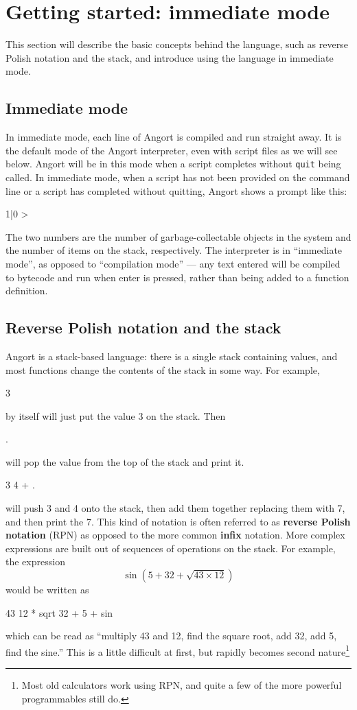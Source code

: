 \section{Getting started: immediate mode}
This section will describe the basic concepts behind the language,
such as reverse Polish notation and the stack, and introduce
using the language in immediate mode.   

\subsection{Immediate mode}
In immediate mode, each line of Angort is compiled and run straight
away. It is the default mode of the Angort interpreter, even with script
files as we will see below.
Angort will be in
this mode when a script completes without \texttt{quit} 
being called.
In immediate mode, when a script has not been provided on the command
line or a script has completed without quitting, Angort shows a prompt like this:
\begin{v}
1|0 >
\end{v}
The two numbers are the number of garbage-collectable objects in the
system and the number of items on the stack, respectively.
The interpreter is in ``immediate mode'', as opposed to ``compilation
mode'' --- any text entered will be compiled to bytecode and run when
enter is pressed,
rather than being added to a function definition.

\subsection{Reverse Polish notation and the stack}
Angort is a stack-based language:
there is a single stack containing
values, and most functions change the contents
of the stack in some way. For example,
\begin{v}
3
\end{v}
by itself will just put the value 3 on the stack. Then
\begin{v}
.
\end{v}
will pop the value from the top of the stack and print it.
\begin{v}
3 4 + .
\end{v}
will push 3 and 4 onto the stack, then add them together replacing them
with 7, and then print the 7. This kind of notation is often
referred to as \textbf{reverse Polish notation} (RPN) as opposed to the more common
\textbf{infix} notation. More complex expressions are built 
out of sequences of operations on the stack. For example, the expression
\[
\sin(5+32+\sqrt{43 \times 12})
\]
would be written as
\begin{v}
43 12 * sqrt 32 + 5 + sin
\end{v}
which can be read as ``multiply 43 and 12, find the square root,
add 32, add 5, find the sine.''
This is a little difficult at first, but rapidly becomes second
nature\footnote{Most old calculators work using RPN, and quite a few
of the more powerful programmables still do.}

